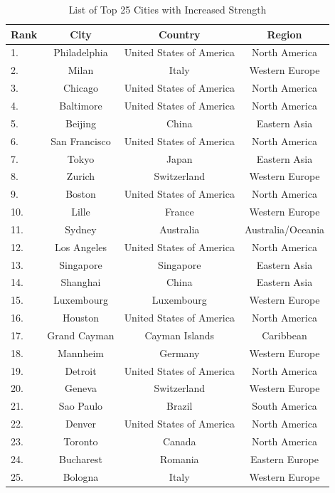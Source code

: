 \begin{table}[h]
	\centering
	\caption{List of Top 25 Cities with Increased Strength}
	\begin{scriptsize}
	\begin{tabular}{|l|c|c|c|}
	\hline \textbf{Rank} & \textbf{City} & \textbf{Country} & \textbf{Region} 			\\   
	\hline 
	 1. & Philadelphia      & United States of America 			& North America 		\\	
	 2. & Milan      		& Italy			 					& Western Europe  		\\	
	 3. & Chicago 			& United States of America 			& North America 		\\	
	 4. & Baltimore 		& United States of America 			& North America 		\\	
	 5. & Beijing 			& China 							& Eastern Asia	 		\\	
	 6. & San Francisco 	& United States of America 			& North America 		\\	
	 7. & Tokyo 			& Japan 							& Eastern Asia	 		\\		
	 8. & Zurich 			& Switzerland		 				& Western Europe		\\	
	 9. & Boston 			& United States of America 			& North America 		\\	
	 10. & Lille 			& France 							& Western Europe		\\	
	 11. & Sydney 			& Australia 						& Australia/Oceania		\\	
	 12. & Los Angeles 		& United States of America 			& North America			\\	
	 13. & Singapore 		& Singapore							& Eastern Asia  		\\	
	 14. & Shanghai	 		& China				 				& Eastern Asia			\\ 
	 15. & Luxembourg  		& Luxembourg 						& Western Europe		\\ 				
	 16. & Houston 			& United States of America  		& North America    		\\ 
	 17. & Grand Cayman 	& Cayman Islands 					& Caribbean		  		\\
	 18. & Mannheim 		& Germany	  						& Western Europe   		\\
	 19. & Detroit 			& United States of America  		& North America   		\\
	 20. & Geneva	 		& Switzerland		 				& Western Europe		\\	
	 21. & Sao Paulo 		& Brazil	 						& South America			\\
	 22. & Denver 			& United States of America  		& North America 		\\
	 23. & Toronto	 		& Canada					  		& North America 		\\
	 24. & Bucharest 		& Romania					  		& Eastern Europe   		\\
	 25. & Bologna 			& Italy  							& Western Europe   		\\
	\hline
	\end{tabular} 
	\end{scriptsize}
	\label{tab:appendix-B-strength-increasing}
\end{table}


